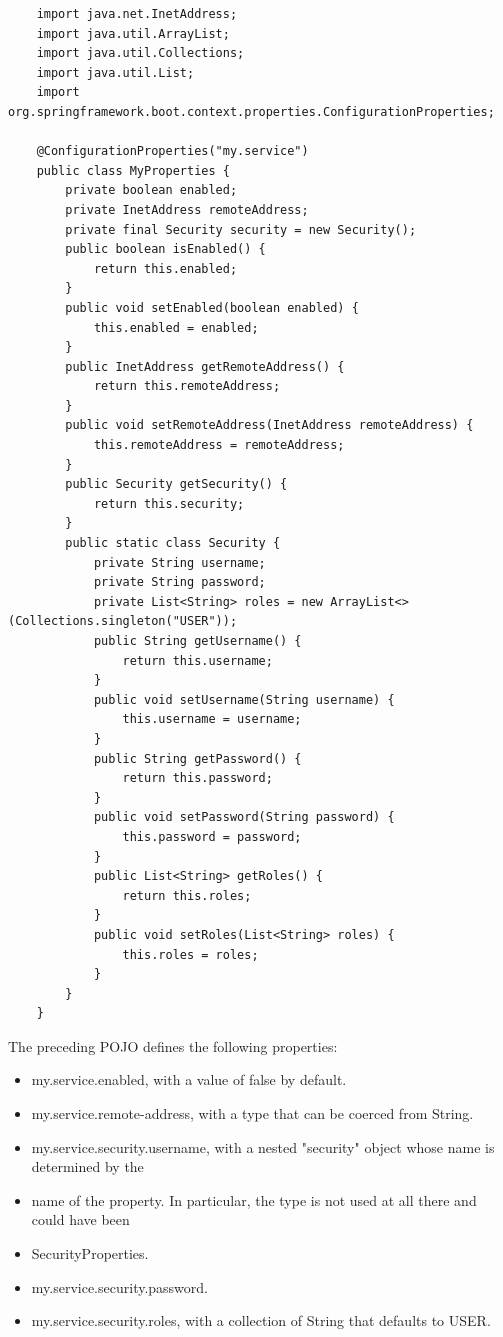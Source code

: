 \documentclass{scrartcl}
\begin{document}
\begin{lstlisting}
    import java.net.InetAddress;
    import java.util.ArrayList;
    import java.util.Collections;
    import java.util.List;
    import org.springframework.boot.context.properties.ConfigurationProperties;

    @ConfigurationProperties("my.service")
    public class MyProperties {
        private boolean enabled;
        private InetAddress remoteAddress;
        private final Security security = new Security();
        public boolean isEnabled() {
            return this.enabled;
        }
        public void setEnabled(boolean enabled) {
            this.enabled = enabled;
        }
        public InetAddress getRemoteAddress() {
            return this.remoteAddress;
        }
        public void setRemoteAddress(InetAddress remoteAddress) {
            this.remoteAddress = remoteAddress;
        }
        public Security getSecurity() {
            return this.security;
        }
        public static class Security {
            private String username;
            private String password;
            private List<String> roles = new ArrayList<>(Collections.singleton("USER"));
            public String getUsername() {
                return this.username;
            }
            public void setUsername(String username) {
                this.username = username;
            }
            public String getPassword() {
                return this.password;
            }
            public void setPassword(String password) {
                this.password = password;
            }
            public List<String> getRoles() {
                return this.roles;
            }
            public void setRoles(List<String> roles) {
                this.roles = roles;
            }
        }
    }
\end{lstlisting}

The preceding POJO defines the following properties:

\begin{itemize}
    \item my.service.enabled, with a value of false by default.
    \item my.service.remote-address, with a type that can be coerced from String.
    \item my.service.security.username, with a nested "security" object whose name is determined by the
    \item name of the property. In particular, the type is not used at all there and could have been
    \item SecurityProperties.
    \item my.service.security.password.
    \item my.service.security.roles, with a collection of String that defaults to USER.
\end{itemize}
\end{document}
